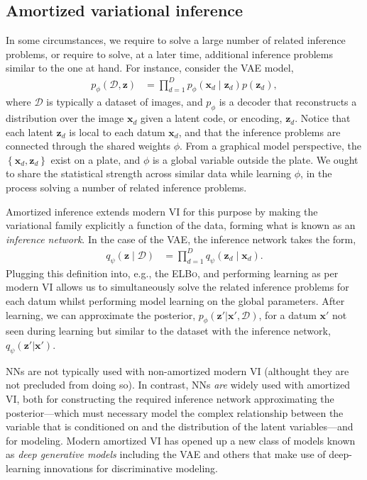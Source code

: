 \subsection{Amortized variational inference}\label{sec:amortized-vi}
In some circumstances, we require to solve a large number of related inference problems, or require to solve, at a later time, additional inference problems similar to the one at hand. For instance, consider the VAE model,
\begin{align*}
	p_\phi(\mathcal{D},\mathbf{z}) &= \prod^D_{d=1}p_\phi(\mathbf{x}_d\mid\mathbf{z}_d)p(\mathbf{z}_d),
\end{align*}
where $\mathcal{D}$ is typically a dataset of images, and $p_\phi$ is a decoder that reconstructs a distribution over the image $\mathbf{x}_d$ given a latent code, or encoding, $\mathbf{z}_d$. Notice that each latent $\mathbf{z}_d$ is local to each datum $\mathbf{x}_d$, and that the inference problems are connected through the shared weights $\phi$. From a graphical model perspective, the $\left\{\mathbf{x}_d,\mathbf{z}_d\right\}$ exist on a plate, and $\phi$ is a global variable outside the plate. We ought to share the statistical strength across similar data while learning $\phi$, in the process solving a number of related inference problems.

Amortized inference \citep{dayan1995helmholtz, RezendeEtAl2014, KingmaWelling2013} extends modern VI for this purpose by making the variational family explicitly a function of the data, forming what is known as an \emph{inference network}. In the case of the VAE, the inference network takes the form,
\begin{align*}
	q_\psi(\mathbf{z}\mid\mathcal{D}) &= \prod^D_{d=1}q_\psi(\mathbf{z}_d\mid\mathbf{x}_d).
\end{align*}
Plugging this definition into, e.g., the {\scshape ELBo}, and performing learning as per modern VI allows us to simultaneously solve the related inference problems for each datum whilst performing model learning on the global parameters. After learning, we can approximate the posterior, $p_\phi(\mathbf{z}'|\mathbf{x}',\mathcal{D})$, for a datum $\mathbf{x}'$ not seen during learning but similar to the dataset with the inference network, $q_\psi(\mathbf{z}'|\mathbf{x}')$.

NNs are not typically used with non-amortized modern VI (althought they are not precluded from doing so). In contrast, NNs \emph{are} widely used with amortized VI, both for constructing the required inference network approximating the posterior---which must necessary model the complex relationship between the variable that is conditioned on and the distribution of the latent variables---and for modeling. Modern amortized VI has opened up a new class of models known as \emph{deep generative models} including the VAE and others \citep{GregorEtAl2015,eslami2016attend,bornschein2017variational} that make use of deep-learning innovations for discriminative modeling.

